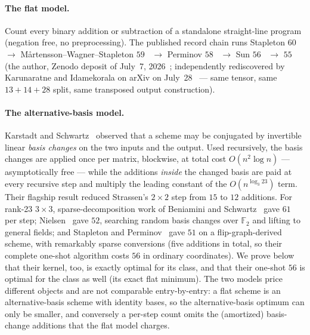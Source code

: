 \documentclass[11pt]{article}
\theoremstyle{definition}
\theoremstyle{remark}
\newcommand{\F}{\mathbb{F}}
\begin{document}
\paragraph{The flat model.}  Count every binary addition or
subtraction of a standalone straight-line program (negation free, no
preprocessing).  The published record chain runs
Stapleton $60$~\cite{Stapleton25} $\to$
M{\aa}rtensson--Wagner--Stapleton $59$~\cite{MWS26} $\to$
Perminov $58$~\cite{Perminov25} $\to$ Sun $56$~\cite{Sun26} $\to$
$55$ (the author, Zenodo deposit of July~7,
2026~\cite{Sidebottom26}; independently rediscovered by Karunaratne
and Idamekorala on arXiv on July~28~\cite{KI26} --- same tensor, same
$13{+}14{+}28$ split, same transposed output construction).

\paragraph{The alternative-basis model.}  Karstadt and
Schwartz~\cite{KS20} observed that a scheme may be conjugated by
invertible linear \emph{basis changes} on the two inputs and the
output.  Used recursively, the basis changes are applied once per
matrix, blockwise, at total cost $O(n^2\log n)$ --- asymptotically
free --- while the additions \emph{inside} the changed basis are paid
at every recursive step and multiply the leading constant of the
$O(n^{\log_3 23})$ term.  Their flagship result reduced Strassen's
$2\times2$ step from $15$ to $12$ additions.  For rank-23 $3\times3$,
sparse-decomposition work of Beniamini and Schwartz~\cite{BS19} gave
$61$ per step; Nielsen~\cite{Nielsen26} gave $52$, searching random
basis changes over $\F_2$ and lifting to general fields; and Stapleton
and Perminov~\cite{SP26} gave $51$ on a flip-graph-derived scheme,
with remarkably sparse conversions (five additions in total, so their
complete one-shot algorithm costs $56$ in ordinary coordinates).  We
prove below that their kernel, too, is exactly optimal for its class,
and that their one-shot $56$ is optimal for the class as well (its
exact flat minimum).  The two models price different objects and are not
comparable entry-by-entry: a flat scheme is an alternative-basis
scheme with identity bases, so the alternative-basis optimum can only
be smaller, and conversely a per-step count omits the (amortized)
basis-change additions that the flat model charges.
\end{document}
